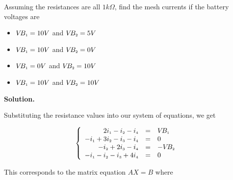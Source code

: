 \documentclass{ximera}
\begin{document}
\begin{example}
Assuming the resistances are all $1 k\Omega$, find the mesh currents if the battery voltages are

\begin{multicols}{2}

\begin{itemize}

\item  $V\!B_{\mbox{\tiny$1$}} = 10 V$ and $V\!B_{\mbox{\tiny$2$}} = 5 V$

\item  $V\!B_{\mbox{\tiny$1$}} = 10 V$ and $V\!B_{\mbox{\tiny$2$}} = 0 V$

\end{itemize}

\end{multicols}

\begin{multicols}{2}

\begin{itemize}

\item  $V\!B_{\mbox{\tiny$1$}} = 0 V$ and $V\!B_{\mbox{\tiny$2$}} = 10 V$

\item  $V\!B_{\mbox{\tiny$1$}} = 10 V$ and $V\!B_{\mbox{\tiny$2$}} = 10 V$

\end{itemize} 

\end{multicols}


{\bf Solution.}  

 Substituting the resistance values into our system of equations, we get

\[ \left\{ \begin{array}{rcl} 2i_{\mbox{\tiny$1$}} - i_{\mbox{\tiny$2$}}-i_{\mbox{\tiny$4$}} & = & V\!B_{\mbox{\tiny$1$}} \\
-i_{\mbox{\tiny$1$}} + 3i_{\mbox{\tiny$2$}} - i_{\mbox{\tiny$3$}} - i_{\mbox{\tiny$4$}} & = & 0 \\
-i_{\mbox{\tiny$2$}} + 2i_{\mbox{\tiny$3$}} - i_{\mbox{\tiny$4$}} & = & -V\!B_{\mbox{\tiny$2$}} \\
-i_{\mbox{\tiny$1$}} - i_{\mbox{\tiny$2$}}-i_{\mbox{\tiny$3$}} + 4i_{\mbox{\tiny$4$}} & = & 0 \\  \end{array} \right.\]
                              
This corresponds to the matrix equation $AX = B$ where 

\[ \begin{array}{ccc} 


\end{array}\]
\end{example}
\end{document}
